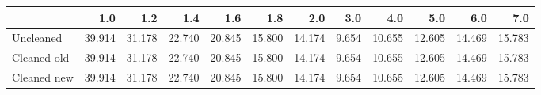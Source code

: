 \begin{tabular}{lrrrrrrrrrrr}
\toprule
{} &    1.0 &    1.2 &    1.4 &    1.6 &    1.8 &    2.0 &   3.0 &    4.0 &    5.0 &    6.0 &    7.0 \\
\midrule
Uncleaned   & 39.914 & 31.178 & 22.740 & 20.845 & 15.800 & 14.174 & 9.654 & 10.655 & 12.605 & 14.469 & 15.783 \\
Cleaned old & 39.914 & 31.178 & 22.740 & 20.845 & 15.800 & 14.174 & 9.654 & 10.655 & 12.605 & 14.469 & 15.783 \\
Cleaned new & 39.914 & 31.178 & 22.740 & 20.845 & 15.800 & 14.174 & 9.654 & 10.655 & 12.605 & 14.469 & 15.783 \\
\bottomrule
\end{tabular}
